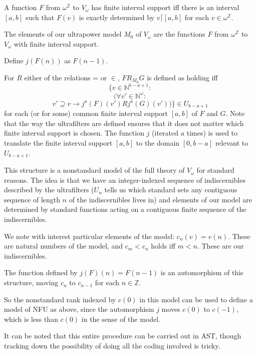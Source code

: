 \documentclass{slides}
\begin{document}
\begin{slide}

A function $F$ from $\omega^{\mathbb Z}$ to $V_\omega$ has finite interval support iff there is an interval
$[a,b]$ such that $F(v)$ is exactly determined by $v\lceil [a,b]$ for each $v \in \omega^\mathbb Z$.

The elements of our ultrapower model $M_0$ of $V_\omega$ are the functions $F$ from $\omega^\mathbb Z$ to $V_\omega$ with finite interval support.

\end{slide}

\begin{slide}

Define $j(F(n))$ as $F(n-1)$.

For $R$ either of the relations = or $\in$, $F R_{M_0} G$ is defined as holding iff $$\{v \in \mathbb N^{b-a+1}:$$ $$(\forall v' \in \mathbb N^\omega:$$ $$  v' \supseteq v \rightarrow j^a(F)(v') R j^a(G)(v'))\} \in U_{b-a+1}$$ for each (or for some)  common finite interval support $[a,b]$ of $F$ and $G$.  Note that the way the ultrafilters are defined ensures that it does not matter which finite interval support is chosen.  The function $j$ (iterated $a$ times) is used to translate the finite interval support $[a,b]$ to the domain $[0,b-a]$ relevant to $U_{b-a+1}$.
\end{slide}

\begin{slide}

This structure is a nonstandard model of the full theory of $V_\omega$ for standard reasons.  The idea is that
we have an integer-indexed sequence of indiscernibles described by the ultrafilters ($U_n$ tells us which standard sets
any contiguous sequence of length $n$ of the indiscernibles lives in) and elements of our model are determined
by standard functions acting on a contiguous finite sequence of the indiscernibles.

\end{slide}

\begin{slide}

We note with interest particular elements of the model:  $c_n(v) = v(n)$.  These are natural numbers of the model,
and $c_m < c_n$ holds iff $m<n$.  These are our indiscernibles.

The function defined by $j(F)(n) = F(n-1)$ is an automorphism of this structure, moving $c_n$ to $c_{n-1}$ for each $n \in \mathbb Z$.

So the nonstandard rank indexed by $c(0)$ in this model can be used to define a model of NFU as above, since the automorphism $j$ moves $c(0)$ to $c(-1)$, which is less than $c(0)$ in the sense of the model.

It can be noted that this entire procedure can be carried out in AST, though tracking down the possibility of doing all the coding involved is tricky.

\end{slide}
\end{document}
